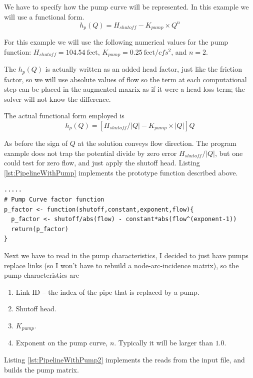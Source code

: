 We have to specify how the pump curve will be represented.
In this example we will use a functional form.
\begin{equation}
h_p(Q) = H_{shutoff} - K_{pump}\times Q^{n}
\end{equation}

For this example we will use the following numerical values for the pump function:
$H_{shutoff} = 104.54~\text{feet}$, $K_{pump} = 0.25~\text{feet}/cfs^2$, and $n = 2$.

The $h_p(Q)$ is actually written as an added head factor, just like the friction factor, so we will use absolute values of flow so the term at each computational step can be placed in the augmented maxrix as if it were a head loss term; the solver will not know the difference.

The actual functional form employed is
\begin{equation}
h_p(Q) = [H_{shutoff}/|Q| - K_{pump}\times |Q^{}|]Q
\end{equation}

As before the sign of $Q$ at the solution conveys flow direction.   
The program example does not trap the potential divide by zero error $H_{shutoff}/|Q|$, but one could test for zero flow, and just apply the shutoff head.  
Listing \ref{lst:PipelineWithPump} implements the prototype function described above.  

\begin{lstlisting}[caption=R Code to pump prototype function \\ , label=lst:PipelineWithPump]
.....
# Pump Curve factor function
p_factor <- function(shutoff,constant,exponent,flow){
  p_factor <- shutoff/abs(flow) - constant*abs(flow^(exponent-1))
  return(p_factor)
}
\end{lstlisting}   

Next we have to read in the pump characteristics, I decided to just have pumps replace links (so I won't have to rebuild a node-arc-incidence matrix), so the pump characteristics are 
\begin{enumerate}
\item Link ID -- the index of the pipe that is replaced by a pump.
\item Shutoff head.
\item $K_{pump}$.
\item Exponent on the pump curve, $n$.  Typically it will be larger than $1.0$.  
\end{enumerate}

Listing \ref{lst:PipelineWithPump2} implements the reads from the input file, and builds the pump matrix.  

